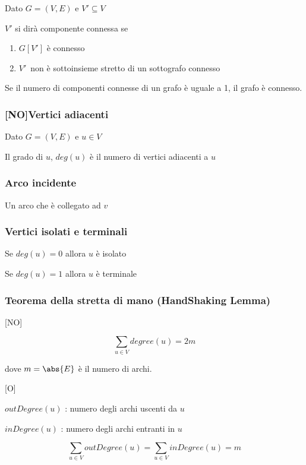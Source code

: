 \documentclass[11pt,a4paper,twoside,openright]{book}
\providecommand{\tightlist}{\setlength{\itemsep}{0pt}\setlength{\parskip}{0pt}}
\begin{document}
{Dato $G=(V,E)$ e $V' \subseteq V$}

{$V'$ si dirà componente connessa se }

\begin{enumerate}
\tightlist
\item
  {$G[V']$ è connesso}
\item
  $V'${~non è sottoinsieme stretto di un sottografo connesso}
\end{enumerate}

{Se il numero di componenti connesse di un grafo è uguale a 1, }{il
grafo è connesso.}

\subsubsection{{[}NO{]}Vertici adiacenti}

{Dato $G=(V,E)$ e $u \in V$}

{Il grado di $u$, $deg(u)$ è il numero di vertici adiacenti a $u$}

\subsubsection{Arco incidente}

{Un arco che è collegato ad $v$}

\subsubsection{Vertici isolati e terminali}

{Se $deg(u) = 0$ allora $u$ è isolato}

{Se $deg(u) = 1$ allora $u$ è terminale}

\subsubsection{Teorema della stretta di mano (HandShaking Lemma)}

{{[}NO{]}}

\begin{equation}
\sum_{u \in V}{degree(u)} = 2m
\end{equation}

{dove $m = \abs{E}$ è il numero di archi.}

{{[}O{]}}

{$outDegree(u)$ : numero degli archi uscenti da $u$}

{$inDegree(u)$ : numero degli archi entranti in $u$}

\begin{equation}
\sum_{u \in V}{outDegree(u)} = \sum_{u \in V}{inDegree(u)} = m
\end{equation}
\end{document}
